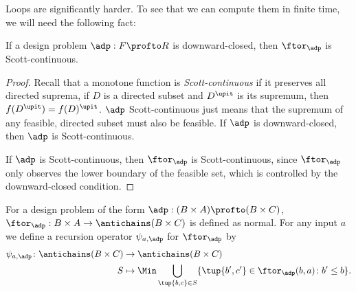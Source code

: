 Loops are significantly harder. To see that we can compute them in finite time, we will need the following fact:
\begin{lemma}
    If a design problem $\adp : F \profto R$ is downward-closed, then $\ftor_\adp$ is Scott-continuous.
\end{lemma}

\begin{proof}
    Recall that a monotone function is \emph{Scott-continuous} if it preserves all directed suprema, \ie  if $D$ is a directed subset and $D^\upit$ is its supremum, then $f(D^\upit) = f(D)^\upit$. $\adp$ Scott-continuous just means that the supremum of any feasible, directed subset must also be feasible. If $\adp$ is downward-closed, then $\adp$ is Scott-continuous.


    If $\adp$ is Scott-continuous, then $\ftor_\adp$ is Scott-continuous, since $\ftor_\adp$ only observes the lower boundary of the feasible set, which is controlled by the downward-closed condition.
\end{proof}

For a design problem of the form $\adp : (B \times A) \profto (B \times C)$, $\ftor_\adp : B \times A \to \antichains (B \times C)$ is defined as normal. For any input $a$ we define a recursion operator $\psi_{a,\adp}$ for $\ftor_\adp$ by
\begin{equation}
    \begin{aligned}
        \psi_{a,\adp} \colon \antichains (B \times C) &\to \antichains (B \times C) \\
        S &\mapsto \Min \bigcup_{\tup{b,c} \in S} \{ \tup{b',c'} \in \ftor_\adp(b,a) \colon b' \leq b \}.
    \end{aligned}
\end{equation}

